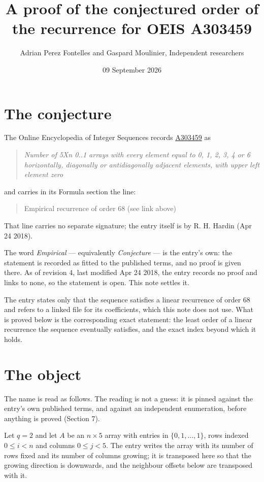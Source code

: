\documentclass[11pt]{article}
\title{A proof of the conjectured order of the recurrence for OEIS A303459}
\author{Adrian Perez Fontelles and Gaspard Moulinier, Independent researchers}
\date{09 September 2026}
\theoremstyle{definition}
\begin{document}
\maketitle
\section{The conjecture}

The Online Encyclopedia of Integer Sequences records \href{https://oeis.org/A303459}{A303459} as

\begin{quote}\itshape Number of 5Xn 0..1 arrays with every element equal to 0, 1, 2, 3, 4 or 6 horizontally, diagonally or antidiagonally adjacent elements, with upper left element zero\end{quote}

and carries in its Formula section the line:

\begin{quote}\ttfamily Empirical recurrence of order 68 (see link above)\end{quote}

That line carries no separate signature; the entry itself is by R. H. Hardin (Apr 24 2018).

The word {\itshape Empirical} --- equivalently {\itshape Conjecture} --- is the entry's own: the statement is recorded as fitted to the published terms, and no proof is given there. As of revision 4, last modified Apr 24 2018, the entry records no proof and links to none, so the statement is open. This note settles it.

The entry states only that the sequence satisfies a linear recurrence of order $68$ and refers to a linked file for its coefficients, which this note does not use. What is proved below is the corresponding exact statement: the least order of a linear recurrence the sequence eventually satisfies, and the exact index beyond which it holds.

\section{The object}

The name is read as follows. The reading is not a guess: it is pinned against the entry's own published terms, and against an independent enumeration, before anything is proved (Section 7).

Let $q = 2$ and let $A$ be an $n \times 5$ array with entries in $\{0,1,\dots,1\}$, rows indexed $0 \le i < n$ and columns $0 \le j < 5$. The entry writes the array with its number of rows fixed and its number of columns growing; it is transposed here so that the growing direction is downwards, and the neighbour offsets below are transposed with it.
\end{document}
